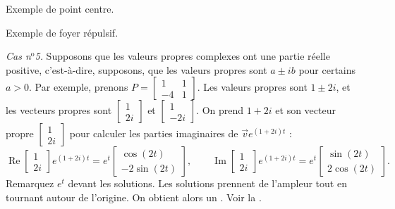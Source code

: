 \begin{myfig}
\parbox[t]{3.0in}{
 \capstart
 \caption{Exemple de point centre.\label{pln:ellipsesfig}}
}
\quad
\parbox[t]{3.0in}{
 \capstart
 \caption{Exemple de foyer répulsif.\label{pln:spiral-sourcefig}}
}
\end{myfig}

\medskip

\emph{Cas n$^\text{o}$5.} Supposons que les valeurs propres complexes ont une partie réelle positive, c'est-à-dire, supposons, que les valeurs propres sont $a \pm ib$ pour certains $a > 0$.
Par exemple, prenons $P = 
\left[ \begin{smallmatrix} 1 & 1 \\ -4 & 1 \end{smallmatrix} \right]$.
Les valeurs propres sont $1\pm 2i$, et les vecteurs propres sont
$\left[ \begin{smallmatrix} 1 \\ 2i \end{smallmatrix} \right]$ et
$\left[ \begin{smallmatrix} 1 \\ -2i \end{smallmatrix} \right]$. On prend
$1 + 2i$ et son vecteur propre
$\left[ \begin{smallmatrix} 1 \\ 2i \end{smallmatrix} \right]$ pour calculer les parties imaginaires de
$\vec{v} e^{(1+2i)t}$ :
\begin{equation*}
\operatorname{Re}
\begin{bmatrix} 1 \\ 2i \end{bmatrix} e^{(1+2i)t} =
e^t
\begin{bmatrix} \cos (2t) \\ -2 \sin (2t) \end{bmatrix} ,
\qquad
\operatorname{Im}
\begin{bmatrix} 1 \\ 2i \end{bmatrix} e^{(1+2i)t} =
e^t
\begin{bmatrix} \sin (2t) \\ 2 \cos (2t) \end{bmatrix} .
\end{equation*}
Remarquez $e^t$ devant les solutions. Les solutions prennent de l'ampleur tout en tournant autour de l'origine. On obtient alors un \emph{}. Voir la .

